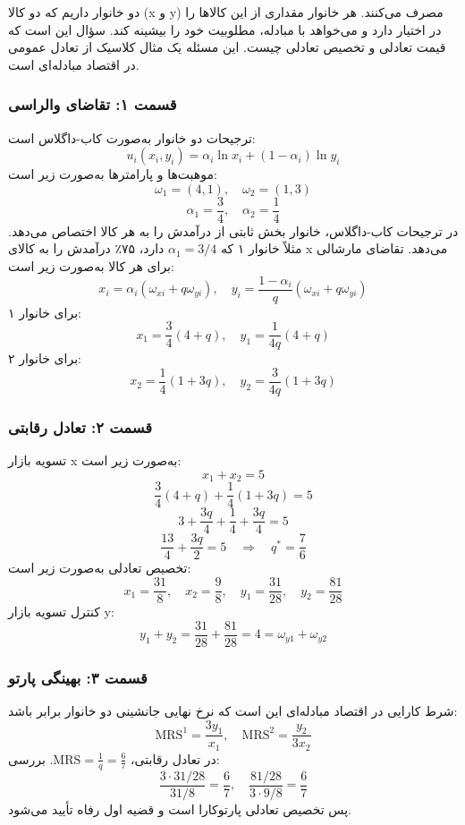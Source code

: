 \documentclass[12pt,a4paper]{article}
\newcommand{\MRS}{\mathrm{MRS}}
\begin{document}
دو خانوار داریم که دو کالا (x و y) مصرف می‌کنند. هر خانوار مقداری از این کالاها را در اختیار دارد و می‌خواهد با مبادله، مطلوبیت خود را بیشینه کند. سؤال این است که قیمت تعادلی و تخصیص تعادلی چیست. این مسئله یک مثال کلاسیک از تعادل عمومی در اقتصاد مبادله‌ای است.

\subsubsection*{قسمت ۱: تقاضای والراسی}

ترجیحات دو خانوار به‌صورت کاب-داگلاس است:
\[
	u_i(x_i, y_i) = \alpha_i \ln x_i + (1 - \alpha_i) \ln y_i
\]
موهبت‌ها و پارامترها به‌صورت زیر است:
\[
	\omega_1 = (4, 1), \quad \omega_2 = (1, 3)
\]
\[
	\alpha_1 = \frac{3}{4}, \quad \alpha_2 = \frac{1}{4}
\]
در ترجیحات کاب-داگلاس، خانوار بخش ثابتی از درآمدش را به هر کالا اختصاص می‌دهد. مثلاً خانوار ۱ که $\alpha_1 = 3/4$ دارد، ۷۵٪ درآمدش را به کالای x می‌دهد. تقاضای مارشالی برای هر کالا به‌صورت زیر است:
\[
	x_i = \alpha_i (\omega_{xi} + q \omega_{yi}), \quad
	y_i = \frac{1 - \alpha_i}{q} (\omega_{xi} + q \omega_{yi})
\]
برای خانوار ۱:
\[
	x_1 = \frac{3}{4}(4 + q), \quad y_1 = \frac{1}{4q}(4 + q)
\]
برای خانوار ۲:
\[
	x_2 = \frac{1}{4}(1 + 3q), \quad y_2 = \frac{3}{4q}(1 + 3q)
\]

\subsubsection*{قسمت ۲: تعادل رقابتی}

تسویه بازار x به‌صورت زیر است:
\[
	x_1 + x_2 = 5
\]
\[
	\frac{3}{4}(4 + q) + \frac{1}{4}(1 + 3q) = 5
\]
\[
	3 + \frac{3q}{4} + \frac{1}{4} + \frac{3q}{4} = 5
\]
\[
	\frac{13}{4} + \frac{3q}{2} = 5
	\quad \Rightarrow \quad
	q^* = \frac{7}{6}
\]
تخصیص تعادلی به‌صورت زیر است:
\[
	x_1 = \frac{31}{8}, \quad x_2 = \frac{9}{8}, \quad y_1 = \frac{31}{28}, \quad y_2 = \frac{81}{28}
\]
کنترل تسویه بازار y:
\[
	y_1 + y_2 = \frac{31}{28} + \frac{81}{28} = 4 = \omega_{y1} + \omega_{y2}
\]

\subsubsection*{قسمت ۳: بهینگی پارتو}

شرط کارایی در اقتصاد مبادله‌ای این است که نرخ نهایی جانشینی دو خانوار برابر باشد:
\[
	\MRS^1 = \frac{3y_1}{x_1}, \quad \MRS^2 = \frac{y_2}{3x_2}
\]
در تعادل رقابتی، $\MRS = \frac{1}{q} = \frac{6}{7}$. بررسی:
\[
	\frac{3 \cdot 31/28}{31/8} = \frac{6}{7}, \quad
	\frac{81/28}{3 \cdot 9/8} = \frac{6}{7}
\]
پس تخصیص تعادلی پارتوکارا است و قضیه اول رفاه تأیید می‌شود.
\end{document}
